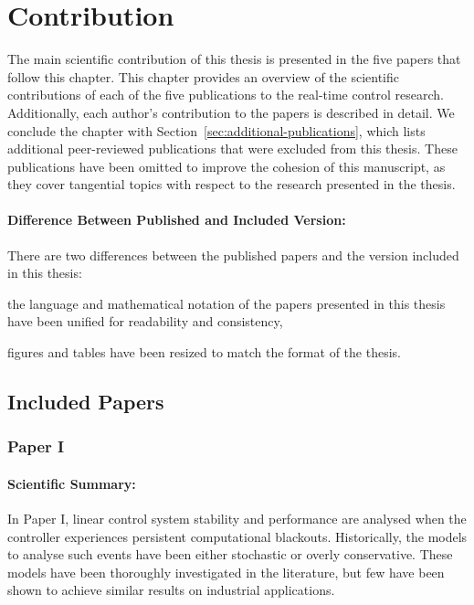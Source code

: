 \chapter{Contribution}%
\label{ch:contribution}%
%
The main scientific contribution of this thesis is presented in the five papers that follow this chapter.
This chapter provides an overview of the scientific contributions of each of the five publications to the real-time control research.
Additionally, each author's contribution to the papers is described in detail.
We conclude the chapter with Section~\ref{sec:additional-publications}, which lists additional peer-reviewed publications that were excluded from this thesis.
These publications have been omitted to improve the cohesion of this manuscript, as they cover tangential topics with respect to the research presented in the thesis.

\subsubsection*{Difference Between Published and Included Version:}%
There are two differences between the published papers and the version included in this thesis:
%
\begin{enumerate*}[label=(\roman*)]
    \item the language and mathematical notation of the papers presented in this thesis have been unified for readability and consistency,
    \item figures and tables have been resized to match the format of the thesis.
\end{enumerate*}


\section{Included Papers}%
\label{sec:paper-summaries}%
%
\subsection*{Paper I}%
%
\begin{quote}
\end{quote}

\subsubsection*{Scientific Summary:}%
%
In Paper I, linear control system stability and performance are analysed when the controller experiences persistent computational blackouts.
Historically, the models to analyse such events have been either stochastic or overly conservative.
These models have been thoroughly investigated in the literature, but few have been shown to achieve similar results on industrial applications.

